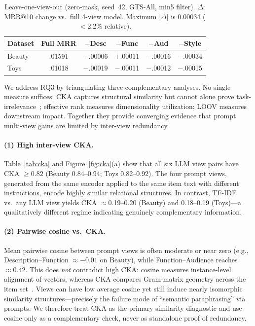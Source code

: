 \documentclass[sigconf,natbib=true,anonymous]{acmart}
\begin{document}
\begin{table}[t]
\centering
\caption{%
Leave-one-view-out (zero-mask, seed~42, GTS-All, min5 filter).
$\Delta$: MRR@10 change vs.\ full 4-view model.
Maximum $|\Delta|$ is 0.00034 ($<$2.2\% relative).%
}
\label{tab:loov}
\small
\setlength{\tabcolsep}{3.5pt}
\begin{tabular}{@{}lccccc@{}}
\toprule
Dataset & Full MRR & $-$Desc & $-$Func & $-$Aud & $-$Style \\
\midrule
Beauty & .01591 & $-$.00006 & $+$.00011 & $-$.00016 & $-$.00034 \\
Toys   & .01018 & $-$.00019 & $-$.00011 & $-$.00012 & $-$.00015 \\
\bottomrule
\end{tabular}
\end{table}

We address RQ3 by triangulating three complementary analyses.
No single measure suffices: CKA captures structural similarity but cannot alone prove task-irrelevance~\cite{kornblith2019cka}; effective rank measures dimensionality utilization; LOOV measures downstream impact.
Together they provide converging evidence that prompt multi-view gains are limited by inter-view redundancy.

\paragraph{(1) High inter-view CKA.}
Table~\ref{tab:cka} and Figure~\ref{fig:cka}(a) show that all six LLM view pairs have CKA $\ge 0.82$ (Beauty 0.84--0.94; Toys 0.82--0.92).
The four prompt views, generated from the same encoder applied to the same item text with different instructions, encode highly similar relational structures.
In contrast, TF-IDF vs.\ any LLM view yields CKA $\approx$0.19--0.20 (Beauty) and 0.18--0.19 (Toys)---a qualitatively different regime indicating genuinely complementary information.

\paragraph{(2) Pairwise cosine vs.\ CKA.}
Mean pairwise cosine between prompt views is often moderate or near zero (e.g., Description--Function $\approx -0.01$ on Beauty), while Function--Audience reaches $\approx 0.42$.
This does \emph{not} contradict high CKA: cosine measures instance-level alignment of vectors, whereas CKA compares Gram-matrix geometry across the item set~\cite{kornblith2019cka}.
Views can have low average cosine yet still induce nearly isomorphic similarity structures---precisely the failure mode of ``semantic paraphrasing'' via prompts.
We therefore treat CKA as the primary similarity diagnostic and use cosine only as a complementary check, never as standalone proof of redundancy.
\end{document}
